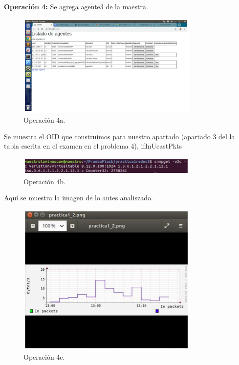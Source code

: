 \noindent
\textbf{Operación 4:} Se agrega agente3 de la maestra. 

\begin{figure}[htbp!]
	\centering
		\includegraphics[width=0.8\textwidth]{images/tarea3/op4a}
	\caption{Operación 4a.}
\end{figure}

\noindent
Se muestra el OID que construimos para nuestro apartado (apartado 3 del la tabla escrita en el examen en el problema 4), ifInUcastPkts 

\begin{figure}[htbp!]
	\centering
		\includegraphics[width=0.8\textwidth]{images/tarea3/op4b}
	\caption{Operación 4b.}
\end{figure}

\noindent
Aquí se muestra la imagen de lo antes analiszado.  

\begin{figure}[htbp!]
	\centering
		\includegraphics[width=0.8\textwidth]{images/tarea3/op4c}
	\caption{Operación 4c.}
\end{figure}

